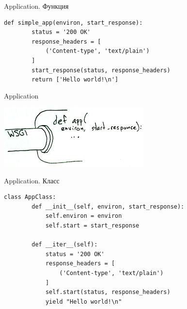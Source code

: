 \begin{frame}[fragile]{Application. Функция}

    \vspace{-1in}
    \begin{lstlisting}[style=python, caption=simple WSGI application]
    def simple_app(environ, start_response):
        status = '200 OK'
        response_headers = [
            ('Content-type', 'text/plain')
        ]
        start_response(status, response_headers)
        return ['Hello world!\n']
    \end{lstlisting}

\end{frame}

\begin{frame}{Application}

    \begin{center}
        \vspace{-0.35in}\includegraphics[width=3in]{media/wsgi-app.png}
    \end{center}

\end{frame}

\begin{frame}[fragile]{Application. Класс}

    \begin{lstlisting}[style=python, caption=WSGI app class]
    class AppClass:
        def __init__(self, environ, start_response):
            self.environ = environ
            self.start = start_response

        def __iter__(self):
            status = '200 OK'
            response_headers = [
                ('Content-type', 'text/plain')
            ]
            self.start(status, response_headers)
            yield "Hello world!\n"
    \end{lstlisting}

\end{frame}


